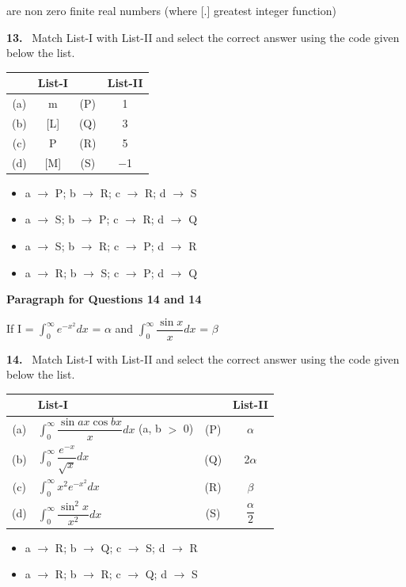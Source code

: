 \documentclass[10pt]{extarticle}
\newcommand{\qn}[1]{\par\smallskip\noindent\textbf{#1.}~}
\newcommand{\paraq}[2]{\par\smallskip\noindent\textbf{Paragraph for Questions #1 and #2}\par}
\newenvironment{qoptions}{\begin{itemize}[leftmargin=1.8em,itemsep=1pt,topsep=2pt,label={}]}{\end{itemize}}
\newcommand{\opt}[2]{\item[(#1)] #2}
\begin{document}
\begin{multicols}{2}
are non zero finite real numbers (where [.] greatest integer function)\par
\qn{13} Match List-I with List-II and select the correct answer using the code given below the list.\par
{\footnotesize\setlength{\tabcolsep}{1.5pt}\noindent\begin{tabular}{|c|c|c|c|}
\hline
 & List-I & & List-II \\
\hline
(a) & m & (P) & 1 \\
\hline
(b) & [L] & (Q) & 3 \\
\hline
(c) & P & (R) & 5 \\
\hline
(d) & [M] & (S) & $-$1 \\
\hline
\end{tabular}}\par
\begin{qoptions}
\opt{A}{a $\rightarrow$ P; b $\rightarrow$ R; c $\rightarrow$ R; d $\rightarrow$ S}
\opt{B}{a $\rightarrow$ S; b $\rightarrow$ P; c $\rightarrow$ R; d $\rightarrow$ Q}
\opt{C}{a $\rightarrow$ S; b $\rightarrow$ R; c $\rightarrow$ P; d $\rightarrow$ R}
\opt{D}{a $\rightarrow$ R; b $\rightarrow$ S; c $\rightarrow$ P; d $\rightarrow$ Q}
\end{qoptions}
\paraq{14}{14}If I = $\displaystyle\int_0^\infty e^{-x^2}dx$ = $\alpha$ and $\displaystyle\int_0^\infty\dfrac{\sin x}{x}dx$ = $\beta$\par
\qn{14} Match List-I with List-II and select the correct answer using the code given below the list.\par
{\footnotesize\setlength{\tabcolsep}{1.5pt}\noindent\begin{tabular}{|c|L{3.9cm}|c|c|}
\hline
 & List-I & & List-II \\
\hline
(a) & $\displaystyle\int_0^\infty\dfrac{\sin ax\cos bx}{x}dx$ (a, b $>$ 0) & (P) & $\alpha$ \\
\hline
(b) & $\displaystyle\int_0^\infty\dfrac{e^{-x}}{\sqrt{x}}dx$ & (Q) & 2$\alpha$ \\
\hline
(c) & $\displaystyle\int_0^\infty x^2e^{-x^2}dx$ & (R) & $\beta$ \\
\hline
(d) & $\displaystyle\int_0^\infty\dfrac{\sin^2x}{x^2}dx$ & (S) & $\dfrac{\alpha}{2}$ \\
\hline
\end{tabular}}\par
\begin{qoptions}
\opt{A}{a $\rightarrow$ R; b $\rightarrow$ Q; c $\rightarrow$ S; d $\rightarrow$ R}
\opt{B}{a $\rightarrow$ R; b $\rightarrow$ R; c $\rightarrow$ Q; d $\rightarrow$ S}

\end{qoptions}
\end{multicols}
\end{document}
